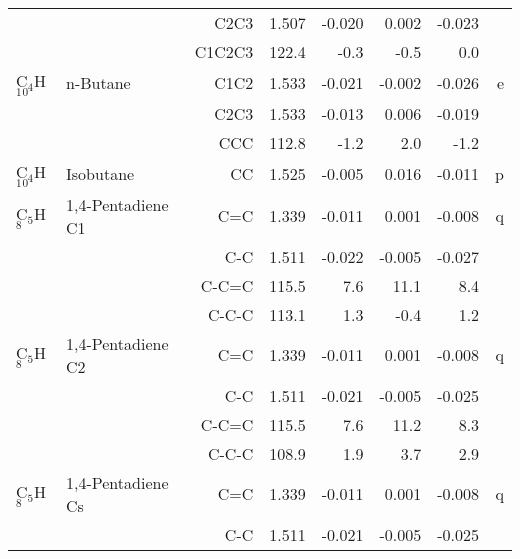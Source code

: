 \begin{table}
\begin{center}
\begin{tabular}{llrrrrrr}
             &                                    &C2C3          &     1.507   &    -0.020 &     0.002 &    -0.023 &       \\
             &                                    &C1C2C3      &     122.4   &      -0.3 &      -0.5 &       0.0   &       \\
 C$_4$H$_1$$_0$       & n-Butane                           &C1C2          &     1.533   &    -0.021 &    -0.002 &    -0.026 &     e \\
             &                                    &C2C3          &     1.533   &    -0.013 &     0.006 &    -0.019 &       \\
             &                                    &CCC         &     112.8   &      -1.2 &       2.0 &      -1.2   &       \\
 C$_4$H$_1$$_0$       & Isobutane                          &CC            &     1.525   &    -0.005 &     0.016 &    -0.011 &     p \\
 C$_5$H$_8$        & 1,4-Pentadiene  C1                 &C=C           &     1.339   &    -0.011 &     0.001 &    -0.008 &     q \\
             &                                    &C-C           &     1.511   &    -0.022 &    -0.005 &    -0.027 &       \\
             &                                    &C-C=C       &     115.5   &       7.6 &      11.1 &       8.4   &       \\
             &                                    &C-C-C       &     113.1   &       1.3 &      -0.4 &       1.2   &       \\
 C$_5$H$_8$        & 1,4-Pentadiene  C2                 &C=C           &     1.339   &    -0.011 &     0.001 &    -0.008 &     q \\
             &                                    &C-C           &     1.511   &    -0.021 &    -0.005 &    -0.025 &       \\
             &                                    &C-C=C       &     115.5   &       7.6 &      11.2 &       8.3   &       \\
             &                                    &C-C-C       &     108.9   &       1.9 &       3.7 &       2.9   &       \\
 C$_5$H$_8$        & 1,4-Pentadiene  Cs                 &C=C           &     1.339   &    -0.011 &     0.001 &    -0.008 &     q \\
             &                                    &C-C           &     1.511   &    -0.021 &    -0.005 &    -0.025 &       \\

\end{tabular}
\end{center}
\end{table}
